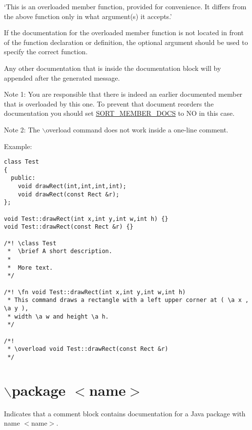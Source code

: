 `This is an overloaded member function, provided for convenience. It differs from the above function only in what argument(s) it accepts.'

If the documentation for the overloaded member function is not located in front of the function declaration or definition, the optional argument should be used to specify the correct function.

Any other documentation that is inside the documentation block will by appended after the generated message.

\begin{Desc}
\item[Note 1:]You are responsible that there is indeed an earlier documented member that is overloaded by this one. To prevent that document reorders the documentation you should set \hyperlink{config_cfg_sort_member_docs}{SORT\_\-MEMBER\_\-DOCS} to NO in this case. \end{Desc}
\begin{Desc}
\item[Note 2:]The $\backslash$overload command does not work inside a one-line comment. \end{Desc}
\begin{Desc}
\item[Example:]

\begin{VerbInclude}\begin{verbatim}class Test 
{
  public:
    void drawRect(int,int,int,int);
    void drawRect(const Rect &r);
};

void Test::drawRect(int x,int y,int w,int h) {}
void Test::drawRect(const Rect &r) {}

/*! \class Test
 *  \brief A short description.
 *   
 *  More text.
 */

/*! \fn void Test::drawRect(int x,int y,int w,int h)
 * This command draws a rectangle with a left upper corner at ( \a x , \a y ),
 * width \a w and height \a h. 
 */

/*!
 * \overload void Test::drawRect(const Rect &r)
 */

\end{verbatim}
\end{VerbInclude}
 \end{Desc}


 \hypertarget{commands_cmdpackage}{}\section{$\backslash$package $<$name$>$}\label{commands_cmdpackage}
 Indicates that a comment block contains documentation for a Java package with name $<$name$>$.



